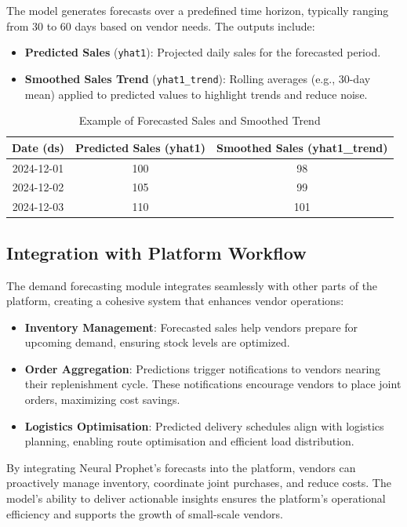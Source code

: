 The model generates forecasts over a predefined time horizon, typically ranging from 30 to 60 days based on vendor needs. The outputs include:

\begin{itemize}
    \item \textbf{Predicted Sales} (\texttt{yhat1}): Projected daily sales for the forecasted period.
    \item \textbf{Smoothed Sales Trend} (\texttt{yhat1\_trend}): Rolling averages (e.g., 30-day mean) applied to predicted values to highlight trends and reduce noise.
\end{itemize}

\begin{table}[h!]
    \centering
    \begin{tabular}{|c|c|c|}
        \hline
        \textbf{Date (ds)} & \textbf{Predicted Sales (yhat1)} & \textbf{Smoothed Sales (yhat1\_trend)} \\
        \hline
        2024-12-01         & 100                              & 98                                     \\
        2024-12-02         & 105                              & 99                                     \\
        2024-12-03         & 110                              & 101                                    \\
        \hline
    \end{tabular}
    \caption{Example of Forecasted Sales and Smoothed Trend}
\end{table}

\subsection{Integration with Platform Workflow}

The demand forecasting module integrates seamlessly with other parts of the platform, creating a cohesive system that enhances vendor operations:

\begin{itemize}
    \item \textbf{Inventory Management}: Forecasted sales help vendors prepare for upcoming demand, ensuring stock levels are optimized.
    \item \textbf{Order Aggregation}: Predictions trigger notifications to vendors nearing their replenishment cycle. These notifications encourage vendors to place joint orders, maximizing cost savings.
    \item \textbf{Logistics Optimisation}: Predicted delivery schedules align with logistics planning, enabling route optimisation and efficient load distribution.
\end{itemize}
By integrating Neural Prophet’s forecasts into the platform, vendors can proactively manage inventory, coordinate joint purchases, and reduce costs. The model’s ability to deliver actionable insights ensures the platform’s operational efficiency and supports the growth of small-scale vendors.